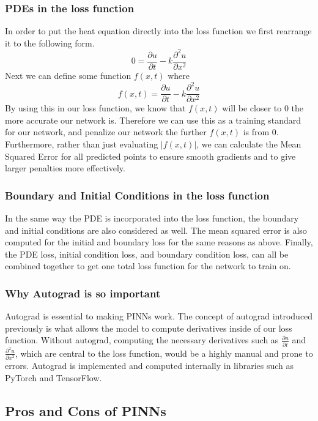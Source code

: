 \documentclass[12pt, reqno]{amsart}
\begin{document}
\subsubsection{PDEs in the loss function}
In order to put the heat equation directly into the loss function we first rearrange it to the following form.
\begin{equation*}
0 = \frac{\partial u}{\partial t} - k\frac{\partial^2u}{\partial x^2}
\end{equation*}
Next we can define some function $f(x,t)$ where
\begin{equation*}
f(x,t) = \frac{\partial u}{\partial t} - k\frac{\partial^2u}{\partial x^2}
\end{equation*}
By using this in our loss function, we know that $f(x,t)$ will be closer to 0 the more accurate our network is. Therefore we can use this as a training standard for our network, and penalize our network the further $f(x,t)$ is from 0. Furthermore, rather than just evaluating $|f(x,t)|$, we can calculate the Mean Squared Error for all predicted points to ensure smooth gradients and to give larger penalties more effectively.
\subsubsection{Boundary and Initial Conditions in the loss function}
In the same way the PDE is incorporated into the loss function, the boundary and initial conditions are also considered as well. The mean squared error is also computed for the initial and boundary loss for the same reasons as above. Finally, the PDE loss, initial condition loss, and boundary condition loss, can all be combined together to get one total loss function for the network to train on.
\subsubsection{Why Autograd is so important}
Autograd is essential to making PINNs work. The concept of autograd introduced previously is what allows the model to compute derivatives inside of our loss function. Without autograd, computing the necessary derivatives such as $\frac{\partial u}{\partial t}$ and $\frac{\partial ^2 u}{\partial x^2}$, which are central to the loss function, would be a highly manual and prone to errors. Autograd is implemented and computed internally in libraries such as PyTorch and TensorFlow.
\subsection{Pros and Cons of PINNs}
\end{document}
